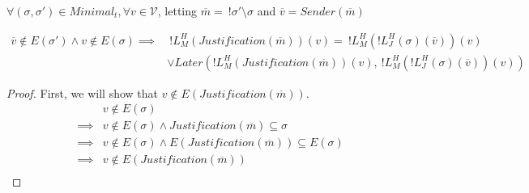 \begin{lemma}
$\forall (\sigma, \sigma') \in Minimal_t, \forall v \in \mathcal{V}$, letting $\overline{m} =~!\sigma'\setminus\sigma$ and $\overline{v} = Sender(\overline{m})$

\begin{align}
\overline{v} \notin E(\sigma') \land v \notin E(\sigma) \implies&~!L^H_M(Justification(\overline{m}))(v) =~!L^H_M(!L^H_J(\sigma)(\overline{v}))(v) \\
&\lor Later(!L^H_M(Justification(\overline{m}))(v),~!L^H_M(!L^H_J(\sigma)(\overline{v}))(v))
\end{align}
\end{lemma}

\begin{proof}
First, we will show that $v \notin E(Justification(\overline{m}))$.
\begin{align}
          &v \notin E(\sigma) \\
  \implies&v \notin E(\sigma) \land Justification(\overline{m}) \subseteq \sigma \\
  \implies&v \notin E(\sigma) \land E(Justification(\overline{m})) \subseteq E(\sigma) \\
  \implies&v \notin E(Justification(\overline{m})) \\
\end{align}


\end{proof}
